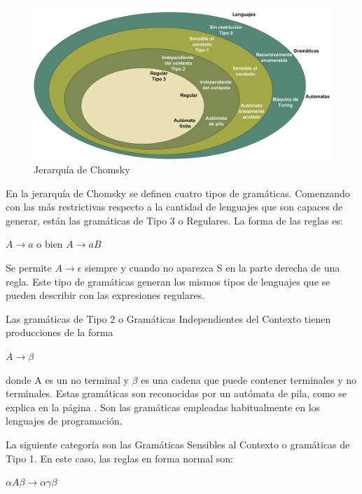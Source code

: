 \begin{figure}[hp!]
    \centering
    \includegraphics[width=1.0\textwidth]{imaxes/c-bases-teoricas/niveles-chomsky.png}
    \caption{Jerarquía de Chomsky}
    \label{fig:niveles-chomsky}
\end{figure}


En la jerarquía de Chomsky se definen cuatro tipos de gramáticas. Comenzando con las más restrictivas respecto a la cantidad de lenguajes que son capaces de generar, están las gramáticas de Tipo 3 o Regulares. La forma de las reglas es:

\begin{center}
$A\rightarrow a$ o bien $A\rightarrow aB$
\end{center}

Se permite $A\rightarrow\epsilon$ siempre y cuando no aparezca S en la parte derecha de una regla. Este tipo de gramáticas generan los mismos tipos de lenguajes que se pueden describir con las expresiones regulares.

Las gramáticas de Tipo 2 o Gramáticas Independientes del Contexto tienen producciones de la forma 

\begin{center}
$A\rightarrow \beta$
\end{center}

donde A es un no terminal y $\beta$ es una cadena que puede contener terminales y no terminales. Estas gramáticas son reconocidas por un autómata de pila, como se explica en la página \pageref{automatas-pila}. Son las gramáticas empleadas habitualmente en los lenguajes de programación.

La siguiente categoría son las Gramáticas Sensibles al Contexto o gramáticas de Tipo 1. En este caso, las reglas en forma normal son:

\begin{center}
$\alpha A\beta\rightarrow \alpha\gamma\beta$
\end{center}

